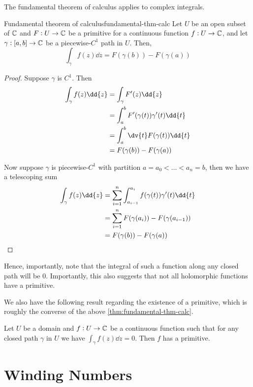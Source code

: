 \documentclass{styles/tufte}
\begin{document}
  The fundamental theorem of calculus applies to complex integrals.
  \begin{theorem}{Fundamental theorem of calculus}{fundamental-thm-calc}
    Let $U$ be an open subset of $\mathbb{C}$ and $F: U \to \mathbb{C}$ be a primitive for a continuous function $f: U \to \mathbb{C}$, and let $\gamma: [a, b] \to \mathbb{C}$ be a piecewise-$C^1$ path in $U$. Then,
    \[ \int_\gamma f(z) \dd{z} = F(\gamma(b)) - F(\gamma(a)) \]
  \end{theorem}
  \begin{proof}
    Suppose $\gamma$ is $C^1$. Then
    \begin{align*}
      \int_\gamma f(z) \dd{z} &= \int_\gamma F'(z) \dd{z} \\
      &= \int_a^b F'(\gamma(t)) \gamma'(t) \dd{t} \\
      &= \int_a^b \dv{t} F(\gamma(t)) \dd{t} \\
      &= F(\gamma(b)) - F(\gamma(a))
    \end{align*}
    
    Now suppose $\gamma$ is piecewise-$C^1$ with partition $a = a_0 < \dots < a_n = b$, then we have a telescoping sum
    \begin{align*}
      \int_\gamma f(z) \dd{z} &= \sum_{i=1}^n \int_{a_{i-1}}^{a_i} f(\gamma(t)) \gamma'(t) \dd{t} \\
      &= \sum_{i=1}^n F(\gamma(a_i)) - F(\gamma(a_{i-1})) \\
      &= F(\gamma(b)) - F(\gamma(a)) \qedhere
    \end{align*}
  \end{proof}
  Hence, importantly, note that the integral of such a function along any closed path will be $0$. Importantly, this also suggests that not all holomorphic functions have a primitive.
  
  We also have the following result regarding the existence of a primitive, which is roughly the converse of the above \cref{thm:fundamental-thm-calc}.
  \begin{theorem}{}{}
    Let $U$ be a domain and $f: U \to \mathbb{C}$ be a continuous function such that for any closed path $\gamma$ in $U$ we have $\int_\gamma f(z) \dd{z} = 0$. Then $f$ has a primitive.
  \end{theorem}



\section{Winding Numbers}
\end{document}
